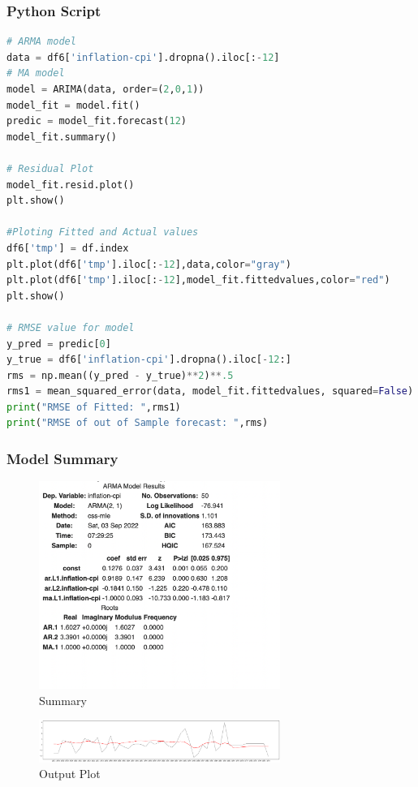 \subsubsection{Python Script} 
\begin{lstlisting}[language=Python]
# ARMA model
data = df6['inflation-cpi'].dropna().iloc[:-12]
# MA model
model = ARIMA(data, order=(2,0,1))
model_fit = model.fit()
predic = model_fit.forecast(12)
model_fit.summary()

# Residual Plot
model_fit.resid.plot()
plt.show()

#Ploting Fitted and Actual values
df6['tmp'] = df.index
plt.plot(df6['tmp'].iloc[:-12],data,color="gray")
plt.plot(df6['tmp'].iloc[:-12],model_fit.fittedvalues,color="red")
plt.show()

# RMSE value for model
y_pred = predic[0]
y_true = df6['inflation-cpi'].dropna().iloc[-12:]
rms = np.mean((y_pred - y_true)**2)**.5
rms1 = mean_squared_error(data, model_fit.fittedvalues, squared=False)
print("RMSE of Fitted: ",rms1)
print("RMSE of out of Sample forecast: ",rms)
\end{lstlisting}

\subsubsection{Model Summary} 
\begin{figure}[H]
    \centering
    \includegraphics[width=0.7\textwidth]{Images/ARMA.png}
    \caption{Summary}
    \label{fig1}
\end{figure}

\begin{figure}[H]
    \centering
    \includegraphics[width=0.7\textwidth]{Images/ARMA_P.png}
    \caption{Output Plot}
    \label{fig1}
\end{figure}

